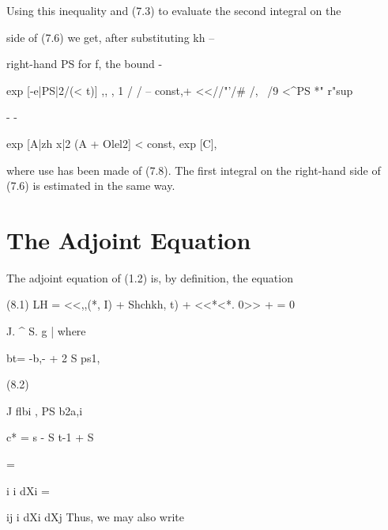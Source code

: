 Using this inequality and (7.3) to evaluate the second integral on the

\begin{ocrformula}
side of (7.6) we get, after substituting kh     --
\end{ocrformula}

right-hand PS for f, the bound -

\begin{ocrformula}
exp [-e|PS|2/(<    t)] ,, , 1
/ / --
const,+ <<//"'/#          /,    \ /9      <^PS *" r"sup
\end{ocrformula}

- -

\begin{ocrformula}
{exp [A|zh                 x|2         (A +     Olel2]} < const, exp [C\x\2],
\end{ocrformula}

where use has been made of (7.8). The first integral on the right-hand side of (7.6) is estimated in the same way.

\section{The Adjoint Equation}
The adjoint equation of (1.2) is, by definition, the equation

\begin{ocrformula}
(8.1)       LH     =            <<,,(*, I)                     +              Shchkh,     t)        +     <<*<*. 0>> +              = 0
\end{ocrformula}

J. \textasciicircum{} S. g | where

\begin{ocrformula}
bt=       -b,- +          2 S           ps1,
\end{ocrformula}

\begin{ocrformula}
(8.2)
\end{ocrformula}

J flbi , PS b2a,i

\begin{ocrformula}
c* = s -           S t-1 +   S
\end{ocrformula}

=

\begin{ocrformula}
i i dXi     =
\end{ocrformula}

ij i dXi dXj Thus, we may also write

